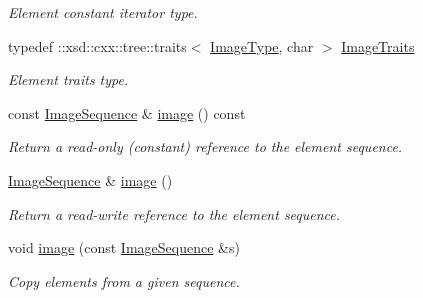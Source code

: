 \begin{DoxyCompactItemize}
\begin{DoxyCompactList}\small\item\em Element constant iterator type. \item\end{DoxyCompactList}\item 
\hypertarget{classopenstack_1_1xml_1_1Images_a20110cfdb16677d2e4fcfc92451eeecf}{
typedef ::xsd::cxx::tree::traits$<$ \hyperlink{classopenstack_1_1xml_1_1Image}{ImageType}, char $>$ \hyperlink{classopenstack_1_1xml_1_1Images_a20110cfdb16677d2e4fcfc92451eeecf}{ImageTraits}}
\label{classopenstack_1_1xml_1_1Images_a20110cfdb16677d2e4fcfc92451eeecf}

\begin{DoxyCompactList}\small\item\em Element traits type. \item\end{DoxyCompactList}\item 
const \hyperlink{classopenstack_1_1xml_1_1Images_af5703f22e0842ce76fb1afc5b52fd2cd}{ImageSequence} \& \hyperlink{classopenstack_1_1xml_1_1Images_a2502cf7e7d41c1112a15eb5f7ec701a4}{image} () const 
\begin{DoxyCompactList}\small\item\em Return a read-\/only (constant) reference to the element sequence. \item\end{DoxyCompactList}\item 
\hyperlink{classopenstack_1_1xml_1_1Images_af5703f22e0842ce76fb1afc5b52fd2cd}{ImageSequence} \& \hyperlink{classopenstack_1_1xml_1_1Images_af3396b6bbae81cbee4c22b7306c1f8e3}{image} ()
\begin{DoxyCompactList}\small\item\em Return a read-\/write reference to the element sequence. \item\end{DoxyCompactList}\item 
void \hyperlink{classopenstack_1_1xml_1_1Images_a74a810069bb181390611ceaaaff83b6c}{image} (const \hyperlink{classopenstack_1_1xml_1_1Images_af5703f22e0842ce76fb1afc5b52fd2cd}{ImageSequence} \&s)
\begin{DoxyCompactList}\small\item\em Copy elements from a given sequence. \item\end{DoxyCompactList}\end{DoxyCompactItemize}
